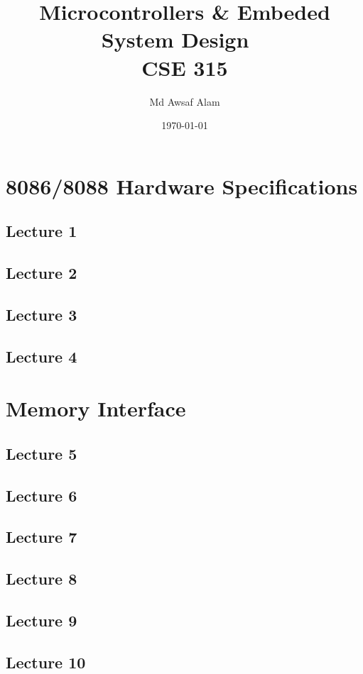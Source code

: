 \documentclass{book}
\title{Microcontrollers \& Embeded System Design ~\textbf{\\CSE 315}}
\author{Md Awsaf Alam}
\date{\today}
\begin{document}
\maketitle

\tableofcontents


\part{8086/8088 Hardware Specifications}

\chapter{Lecture 1}


\chapter{Lecture 2}


\chapter{Lecture 3}


\chapter{Lecture 4}


\part{Memory Interface}

\chapter{Lecture 5}


\chapter{Lecture 6}


\chapter{Lecture 7}


\chapter{Lecture 8}


\chapter{Lecture 9}


\chapter{Lecture 10}

\end{document}
